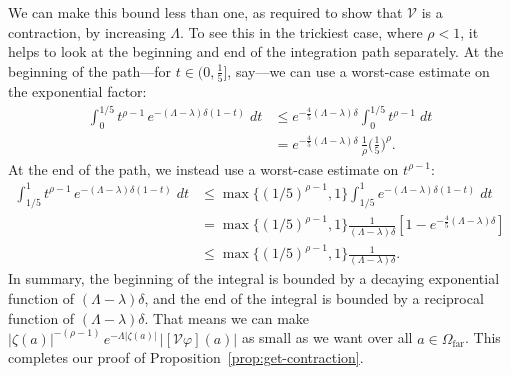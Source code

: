 \documentclass{article}
\theoremstyle{plain}
\newcommand{\volterra}{\mathcal{V}}
\newcommand{\far}{\Omega_\text{far}}
\begin{document}
We can make this bound less than one, as required to show that $\volterra$ is a contraction, by increasing $\Lambda$. To see this in the trickiest case, where $\rho < 1$, it helps to look at the beginning and end of the integration path separately. At the beginning of the path---for $t \in \big(0, \tfrac{1}{5}\big]$, say---we can use a worst-case estimate on the exponential factor:
\begin{align*}
\int_0^{1/5} t^{\rho-1}\,e^{-(\Lambda - \lambda)\delta(1 - t)}\;dt & \le e^{-\frac{4}{5}(\Lambda -\lambda)\delta} \int_0^{1/5} t^{\rho-1}\;dt \\
& = e^{-\frac{4}{5}(\Lambda - \lambda)\delta}\,\tfrac{1}{\rho} \big(\tfrac{1}{5}\big)^\rho.
\end{align*}
At the end of the path, we instead use a worst-case estimate on $t^{\rho-1}$:
\begin{align*}
\int_{1/5}^1 t^{\rho-1}\,e^{-(\Lambda - \lambda)\delta(1 - t)}\;dt & \le \max\{(1/5)^{\rho-1}, 1\} \int_{1/5}^1 e^{-(\Lambda - \lambda)\delta(1 - t)}\;dt \\
& = \max\{(1/5)^{\rho-1}, 1\} \frac{1}{(\Lambda - \lambda)\delta}\left[ 1 - e^{-\tfrac{4}{5}(\Lambda - \lambda)\delta} \right] \\
& \le \max\{(1/5)^{\rho-1}, 1\} \frac{1}{(\Lambda - \lambda)\delta}.
\end{align*}
In summary, the beginning of the integral is bounded by a decaying exponential function of $(\Lambda - \lambda)\delta$, and the end of the integral is bounded by a reciprocal function of $(\Lambda - \lambda)\delta$. That means we can make $|\zeta(a)|^{-(\rho-1)}\,e^{-\Lambda|\zeta(a)|}\,|[\volterra\varphi](a)|$ as small as we want over all $a \in \far$. This completes our proof of Proposition~\ref{prop:get-contraction}.
\end{document}

